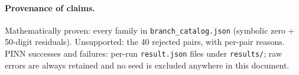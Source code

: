 \documentclass[11pt,a4paper]{article}
\begin{document}
\paragraph{Provenance of claims.} Mathematically proven: every family in
\texttt{branch\_catalog.json} (symbolic zero + 50-digit residuals).
Unsupported: the 40 rejected pairs, with per-pair reasons. PINN successes and
failures: per-run \texttt{result.json} files under \texttt{results/}; raw
errors are always retained and no seed is excluded anywhere in this document.
\end{document}
